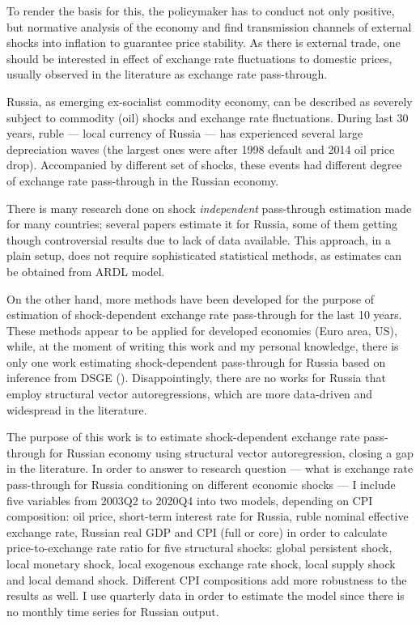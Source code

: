 \documentclass[12pt, a4paper]{extarticle}
\begin{document}
To render the basis for this, the policymaker has to conduct not only positive, but normative analysis of the economy and find transmission channels of external shocks into inflation to guarantee price stability. As there is external trade, one should be interested in effect of exchange rate fluctuations to domestic prices, usually observed in the literature as exchange rate pass-through.

Russia, as emerging ex-socialist commodity economy, can be described as severely subject to commodity (oil) shocks and exchange rate fluctuations. During last 30 years, ruble --- local currency of Russia --- has experienced several large depreciation waves (the largest ones were after 1998 default and 2014 oil price drop). Accompanied by different set of shocks, these events had different degree of exchange rate pass-through in the Russian economy. 

There is many research done on shock \textit{independent} pass-through estimation made for many countries; several papers estimate it for Russia, some of them getting though controversial results due to lack of data available. This approach, in a plain setup, does not require sophisticated statistical methods, as estimates can be obtained from ARDL model.

On the other hand, more methods have been developed for the purpose of estimation of shock-dependent exchange rate pass-through for the last 10 years. These methods appear to be applied for developed economies (Euro area, US), while, at the moment of writing this work and my personal knowledge, there is only one work estimating shock-dependent pass-through for Russia based on inference from DSGE (\cite{Khotulev2020}). Disappointingly, there are no works for Russia that employ structural vector autoregressions, which are more data-driven and widespread in the literature.

The purpose of this work is to estimate shock-dependent exchange rate pass-through for Russian economy using structural vector autoregression, closing a gap in the literature. In order to answer to research question --- what is exchange rate pass-through for Russia conditioning on different economic shocks --- I include five variables from 2003Q2 to 2020Q4 into two models, depending on CPI composition: oil price, short-term interest rate for Russia, ruble nominal effective exchange rate, Russian real GDP and CPI (full or core) in order to calculate price-to-exchange rate ratio for five structural shocks: global persistent shock, local monetary shock, local exogenous exchange rate shock, local supply shock and local demand shock. Different CPI compositions add more robustness to the results as well. I use quarterly data in order to estimate the model since there is no monthly time series for Russian output.
\end{document}
